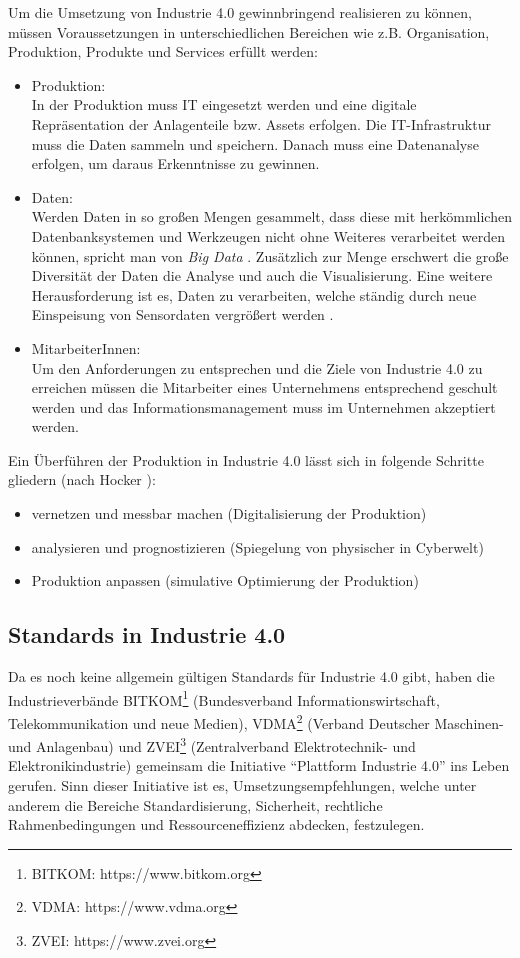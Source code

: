 Um die Umsetzung von Industrie 4.0 gewinnbringend realisieren zu können, müssen Voraussetzungen in unterschiedlichen Bereichen wie z.B. Organisation, Produktion, Produkte und Services erfüllt werden: 
\begin{itemize}
\item Produktion:\\
In der Produktion muss \ac{IT} eingesetzt werden und eine digitale Repräsentation der Anlagenteile bzw. Assets erfolgen. Die IT-Infrastruktur muss die Daten sammeln und speichern. Danach muss eine Datenanalyse erfolgen, um daraus Erkenntnisse zu gewinnen.

\item Daten:\\
Werden Daten in so großen Mengen gesammelt, dass diese  mit herkömmlichen Datenbanksystemen und Werkzeugen nicht ohne Weiteres verarbeitet werden können, spricht man von \textit{Big Data} \parencite{gilchrist2016industry}. Zusätzlich zur Menge erschwert die große Diversität der Daten die Analyse und auch die Visualisierung. Eine weitere Herausforderung ist es, Daten zu verarbeiten, welche ständig durch neue Einspeisung von Sensordaten vergrößert werden \parencite{stackowiak2015big}. 

\item MitarbeiterInnen:\\
Um den Anforderungen zu entsprechen und die Ziele von Industrie 4.0 zu erreichen müssen die Mitarbeiter eines Unternehmens entsprechend geschult werden und das Informationsmanagement muss im Unternehmen akzeptiert werden.
\end{itemize}
\vspace{\baselineskip} 

Ein Überführen der Produktion in Industrie 4.0 lässt sich in folgende Schritte gliedern (nach Hocker \parencite{hocker2015}):

\begin{itemize}
\item vernetzen und messbar machen (Digitalisierung der Produktion)
\item analysieren und prognostizieren (Spiegelung von physischer in Cyberwelt)
\item Produktion anpassen (simulative Optimierung der Produktion) 
\end{itemize}

\subsection{Standards in Industrie 4.0}
Da es noch keine allgemein gültigen Standards für Industrie 4.0 gibt, haben die Industrieverbände BITKOM\footnote{BITKOM: https://www.bitkom.org} (Bundesverband Informationswirtschaft, Telekommunikation und neue Medien), VDMA\footnote{VDMA: https://www.vdma.org} (Verband Deutscher Maschinen- und Anlagenbau) und ZVEI\footnote{ZVEI: https://www.zvei.org} (Zentralverband Elektrotechnik- und Elektronikindustrie) gemeinsam die Initiative "`Plattform Industrie 4.0"' ins Leben gerufen. Sinn dieser Initiative ist es, Umsetzungsempfehlungen, welche unter anderem die Bereiche Standardisierung, Sicherheit, rechtliche Rahmenbedingungen und Ressourceneffizienz abdecken, festzulegen. 

